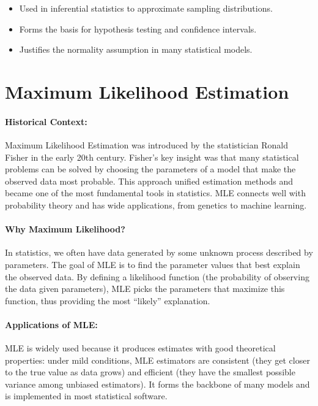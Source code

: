 \documentclass{book}
\begin{document}
\begin{itemize}
    \item Used in inferential statistics to approximate sampling distributions.
    \item Forms the basis for hypothesis testing and confidence intervals.
    \item Justifies the normality assumption in many statistical models.
\end{itemize}

\newpage

\section{Maximum Likelihood Estimation}

\paragraph{Historical Context:}
Maximum Likelihood Estimation was introduced by the statistician Ronald Fisher in the early 20th century. Fisher’s key insight was that many statistical problems can be solved by choosing the parameters of a model that make the observed data most probable. This approach unified estimation methods and became one of the most fundamental tools in statistics. MLE connects well with probability theory and has wide applications, from genetics to machine learning.

\paragraph{Why Maximum Likelihood?}
In statistics, we often have data generated by some unknown process described by parameters. The goal of MLE is to find the parameter values that best explain the observed data. By defining a likelihood function (the probability of observing the data given parameters), MLE picks the parameters that maximize this function, thus providing the most “likely” explanation.

\paragraph{Applications of MLE:}
MLE is widely used because it produces estimates with good theoretical properties: under mild conditions, MLE estimators are consistent (they get closer to the true value as data grows) and efficient (they have the smallest possible variance among unbiased estimators). It forms the backbone of many models and is implemented in most statistical software.\\
\end{document}
